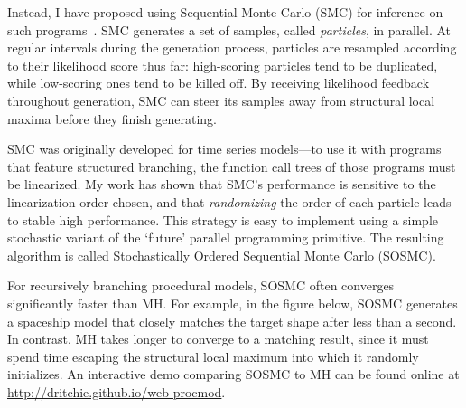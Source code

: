\documentclass[
10pt, %
a4paper, %
oneside, %
headinclude,footinclude, %
BCOR5mm, %
]{scrartcl}
\begin{document}
Instead, I have proposed using Sequential Monte Carlo (SMC) for inference on such programs~\cite{SOSMC}. SMC generates a set of samples, called \emph{particles}, in parallel. At regular intervals during the generation process, particles are resampled according to their likelihood score thus far: high-scoring particles tend to be duplicated, while low-scoring ones tend to be killed off. By receiving likelihood feedback throughout generation, SMC can steer its samples away from structural local maxima before they finish generating.

SMC was originally developed for time series models---to use it with programs that feature structured branching, the function call trees of those programs must be linearized. My work has shown that SMC's performance is sensitive to the linearization order chosen, and that \emph{randomizing} the order of each particle leads to stable high performance. This strategy is easy to implement using a simple stochastic variant of the `future' parallel programming primitive. The resulting algorithm is called Stochastically Ordered Sequential Monte Carlo (SOSMC).

For recursively branching procedural models, SOSMC often converges significantly faster than MH. For example, in the figure below, SOSMC generates a spaceship model that closely matches the target shape after less than a second. In contrast, MH takes longer to converge to a matching result, since it must spend time escaping the structural local maximum into which it randomly initializes.
An interactive demo comparing SOSMC to MH can be found online at \url{http://dritchie.github.io/web-procmod}.
\end{document}

